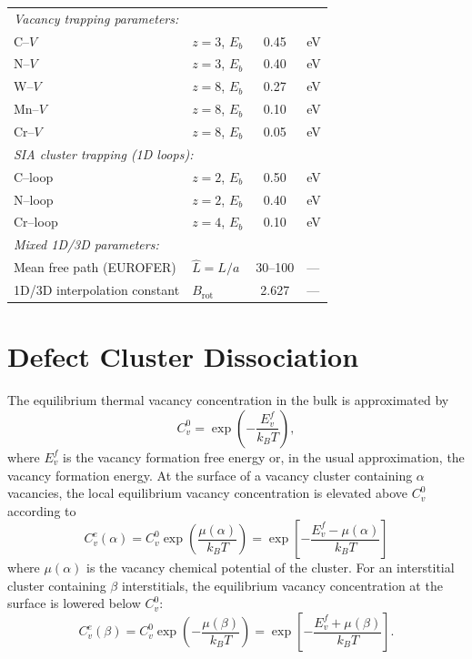 \documentclass[pdflatex,sn-basic]{sn-jnl} %
\begin{document}
\begin{table}[htbp]
\begin{tabular}{@{}llcl@{}}
\multicolumn{4}{l}{\emph{Vacancy trapping parameters:}} \\
C--$V$ & $z=3$, $E_b$ & 0.45 & eV \\
N--$V$ & $z=3$, $E_b$ & 0.40 & eV \\
W--$V$ & $z=8$, $E_b$ & 0.27 & eV \\
Mn--$V$ & $z=8$, $E_b$ & 0.10 & eV \\
Cr--$V$ & $z=8$, $E_b$ & 0.05 & eV \\[4pt]

\multicolumn{4}{l}{\emph{SIA cluster trapping (1D loops):}} \\
C--loop & $z=2$, $E_b$ & 0.50 & eV \\
N--loop & $z=2$, $E_b$ & 0.40 & eV \\
Cr--loop & $z=4$, $E_b$ & 0.10 & eV \\[4pt]

\multicolumn{4}{l}{\emph{Mixed 1D/3D parameters:}} \\
Mean free path (EUROFER) & $\hat{L} = L/a$ & 30--100 & --- \\
1D/3D interpolation constant & $B_{\mathrm{rot}}$ & 2.627 & --- \\
\bottomrule
\end{tabular}
\end{table}


\section{Defect Cluster Dissociation}

The equilibrium thermal vacancy concentration in the bulk is approximated by
\begin{equation}
    C_v^0 = \exp\left(-\frac{E_v^f}{k_BT}\right),
\end{equation}
where $E_v^f$ is the vacancy formation free energy or, in the usual approximation, the vacancy formation energy. At the surface of a vacancy cluster containing $\alpha$ vacancies, the local equilibrium vacancy concentration is elevated above $C_v^0$ according to
\begin{equation}
    C_v^e(\alpha)=C_v^0 \exp\left(\frac{\mu(\alpha)}{k_BT}\right)= \exp\left[-\frac{E_v^f-\mu(\alpha)}{k_BT}\right]
    \end{equation}
where $\mu(\alpha)$ is the vacancy chemical potential of the cluster. For an interstitial cluster containing $\beta$ interstitials, the equilibrium vacancy concentration at the surface is lowered below $C_v^0$:
\begin{equation}
    C_v^e(\beta)=C_v^0 \exp\left(-\frac{\mu(\beta)}{k_BT}\right)  = \exp\left[-\frac{E_v^f+\mu(\beta)}{k_BT}\right].
\end{equation}
\end{document}
